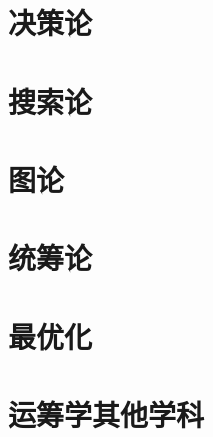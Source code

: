 \documentclass[UTF8]{../09-Mathematics}
\begin{document}
\chapter{决策论}
\chapter{搜索论}
\chapter{图论}
\chapter{统筹论}
\chapter{最优化}
\chapter{运筹学其他学科}
\end{document}
